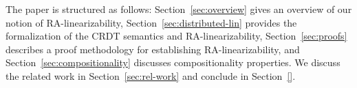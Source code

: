 
The paper is structured as follows:
Section~\ref{sec:overview} gives an overview of our notion of RA-linearizability, Section~\ref{sec:distributed-lin} provides the formalization of the CRDT semantics and RA-linearizability, Section~\ref{sec:proofs} describes a proof methodology for establishing RA-linearizability, and Section~\ref{sec:compositionality} discusses compositionality properties. We discuss the related work in Section~\ref{sec:rel-work} and conclude in Section~\ref{}.





